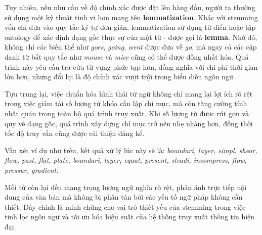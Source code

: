 Tuy nhiên, nếu nhu cầu về độ chính xác được đặt lên hàng đầu, người ta thường sử dụng một kỹ thuật tinh vi hơn mang tên \textbf{lemmatization}. Khác với stemming vốn chỉ dựa vào quy tắc ký tự đơn giản, lemmatization sử dụng từ điển hoặc tập ontology để xác định dạng gốc thực sự của một từ - được gọi là \textbf{lemma}. Nhờ đó, không chỉ các biến thể như \textit{goes}, \textit{going}, \textit{went} được đưa về \textit{go}, mà ngay cả các cặp danh từ bất quy tắc như \textit{mouse} và \textit{mice} cũng có thể được đồng nhất hóa. Quá trình này yêu cầu tra cứu từ vựng phức tạp hơn, đồng nghĩa với chi phí thời gian lớn hơn, nhưng đổi lại là độ chính xác vượt trội trong biểu diễn ngôn ngữ.

Tựu trung lại, việc chuẩn hóa hình thái từ ngữ không chỉ mang lại lợi ích rõ rệt trong việc giảm tải số lượng từ khóa cần lập chỉ mục, mà còn tăng cường tính nhất quán trong toàn bộ quá trình truy xuất. Khi số lượng từ được rút gọn và quy về dạng gốc, quá trình xây dựng chỉ mục trở nên nhẹ nhàng hơn, đồng thời tốc độ truy vấn cũng được cải thiện đáng kể.

Vẫn xét ví dụ như trên, kết quả xử lý lúc này sẽ là:
\textit{boundari, layer, simpl, shear, flow, past, flat, plate, boundari, layer, equat, present, steadi, incompress, flow, pressur, gradient}.

Mỗi từ còn lại đều mang trọng lượng ngữ nghĩa rõ rệt, phản ánh trực tiếp nội dung của văn bản mà không bị phân tán bởi các yếu tố ngữ pháp không cần thiết. Đây chính là minh chứng cho vai trò thiết yếu của stemming trong việc tinh lọc ngôn ngữ và tối ưu hóa hiệu suất của hệ thống truy xuất thông tin hiện đại.